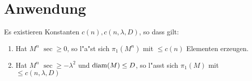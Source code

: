 \section{Anwendung}

\begin{Satz}[Gronov]
  Es existieren Konstanten $c(n), c(n,\lambda,D)$, so dass gilt:
  \begin{enumerate}[label=(\roman*)]
  \item Hat $M^n$ $\sec \geq 0$, so l"a"st sich $\pi_1(M^n)$ mit $\leq c(n)$ Elementen erzeugen.
  \item Hat $M^n$ $\sec \geq - \lambda^2$ und $\operatorname{diam}(M) \leq D$, so l"asst sich $\pi_1(M)$ mit $\leq c(n,\lambda,D)$ 
  \end{enumerate}
\end{Satz}

